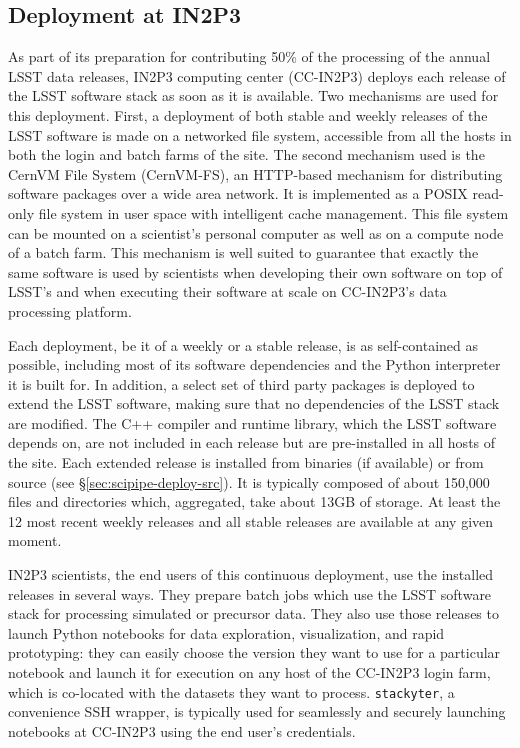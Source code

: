 \subsection{Deployment at IN2P3}

As part of its preparation for contributing 50\% of the processing of the annual LSST data releases, IN2P3 computing center (CC-IN2P3) deploys each  release of the LSST software stack as soon as it is  available.
Two mechanisms are used for this deployment. First, a deployment of both stable and weekly releases of the LSST software is made on a networked file system, accessible from all the hosts in both the login and batch farms of the site. The second mechanism used is the CernVM File System (CernVM-FS)\cite{1742-6596-331-4-042003}, an HTTP-based mechanism for distributing software packages over a wide area network. It is implemented as a POSIX read-only file system in user space with intelligent cache management. This file system can be mounted on a scientist's personal computer as well as on a compute node of a batch farm. This mechanism is well suited to guarantee that exactly the same software is used by scientists when developing their own software on top of LSST's and when executing their software at scale on CC-IN2P3's data processing platform.

Each deployment, be it of a weekly or a stable release, is as self-contained as possible, including most of its software dependencies and the Python interpreter it is built for. In addition, a select set of third party packages is deployed to extend the LSST software, making sure that no dependencies of the LSST stack are modified. The C++ compiler and runtime library, which the LSST software depends on, are not included in each release but are pre-installed in all hosts of the site.
Each extended release is installed from binaries (if available) or from source (see \S\ref{sec:scipipe-deploy-src}). It is typically composed of about 150,000 files and directories which, aggregated, take about 13GB of storage. At least the 12 most recent weekly releases and all stable releases are available at any given moment.

IN2P3 scientists, the end users of this continuous deployment, use the installed releases in several ways. They prepare batch jobs which use the LSST software stack for processing simulated or precursor data. They also use those releases to launch Python notebooks for data exploration, visualization, and rapid prototyping: they can easily choose the version they want to use for a particular notebook and launch it for execution on any host of the CC-IN2P3 login farm, which is co-located with the datasets they want to process.
\texttt{stackyter}\cite{stackyter}, a convenience SSH wrapper, is typically used for seamlessly and securely launching notebooks at CC-IN2P3 using the end user's credentials.

